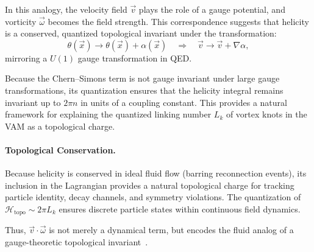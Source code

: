 In this analogy, the velocity field $\vec{v}$ plays the role of a gauge potential, and vorticity $\vec{\omega}$ becomes the field strength. This correspondence suggests that helicity is a conserved, quantized topological invariant under the transformation:
\begin{equation}
\theta(\vec{x}) \rightarrow \theta(\vec{x}) + \alpha(\vec{x}) \quad \Rightarrow \quad \vec{v} \rightarrow \vec{v} + \nabla \alpha,
\end{equation}
mirroring a $U(1)$ gauge transformation in QED.

Because the Chern--Simons term is not gauge invariant under large gauge transformations, its quantization ensures that the helicity integral remains invariant up to $2\pi n$ in units of a coupling constant. This provides a natural framework for explaining the quantized linking number $L_k$ of vortex knots in the VAM as a topological charge.

\paragraph{Topological Conservation.}
Because helicity is conserved in ideal fluid flow (barring reconnection events), its inclusion in the Lagrangian provides a natural topological charge for tracking particle identity, decay channels, and symmetry violations. The quantization of $\mathcal{H}_\text{topo} \sim 2\pi L_k$ ensures discrete particle states within continuous field dynamics.

Thus, $\vec{v} \cdot \vec{\omega}$ is not merely a dynamical term, but encodes the fluid analog of a gauge-theoretic topological invariant~\cite{verlinde2021qft}.

